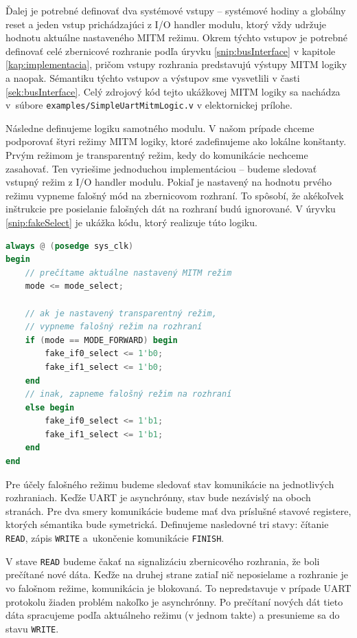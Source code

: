 Ďalej je potrebné definovať dva systémové vstupy -- systémové hodiny a globálny reset a jeden vstup prichádzajúci z I/O handler modulu, ktorý vždy udržuje hodnotu aktuálne nastaveného MITM režimu. Okrem týchto vstupov je potrebné definovať celé zbernicové rozhranie podľa úryvku \ref{snip:busInterface} v kapitole \ref{kap:implementacia}, pričom vstupy rozhrania predstavujú výstupy MITM logiky a naopak. Sémantiku týchto vstupov a výstupov sme vysvetlili v časti \ref{sek:busInterface}. Celý zdrojový kód tejto ukážkovej MITM logiky sa nachádza v~súbore \texttt{examples/SimpleUartMitmLogic.v} v elektornickej prílohe.

Následne definujeme logiku samotného modulu. V našom prípade chceme podporovať štyri režimy MITM logiky, ktoré zadefinujeme ako lokálne konštanty. Prvým režimom je transparentný režim, kedy do komunikácie nechceme zasahovať. Ten vyriešime jednoduchou implementáciou -- budeme sledovať vstupný režim z I/O handler modulu. Pokiaľ je nastavený na hodnotu prvého režimu vypneme falošný mód na zbernicovom rozhraní. To spôsobí, že akékoľvek inštrukcie pre posielanie falošných dát na rozhraní budú ignorované. V úryvku \ref{snip:fakeSelect} je ukážka kódu, ktorý realizuje túto logiku.

\begin{lstlisting}[float,language=Verilog,caption={Prepínanie medzi transparantným a falošným režimom MITM logiky.},label=snip:fakeSelect]
always @ (posedge sys_clk)
begin
    // prečítame aktuálne nastavený MITM režim
    mode <= mode_select;

    // ak je nastavený transparentný režim,
    // vypneme falošný režim na rozhraní
    if (mode == MODE_FORWARD) begin
        fake_if0_select <= 1'b0;
        fake_if1_select <= 1'b0;
    end
    // inak, zapneme falošný režim na rozhraní
    else begin
        fake_if0_select <= 1'b1;
        fake_if1_select <= 1'b1;
    end
end
\end{lstlisting}

Pre účely falošného režimu budeme sledovať stav komunikácie na jednotlivých rozhraniach. Keďže UART je asynchrónny, stav bude nezávislý na oboch stranách. Pre dva smery komunikácie budeme mať dva príslušné stavové registere, ktorých sémantika bude symetrická. Definujeme nasledovné tri stavy: čítanie \texttt{READ}, zápis \texttt{WRITE} a~ukončenie komunikácie \texttt{FINISH}.

V stave \texttt{READ} budeme čakať na signalizáciu zbernicového rozhrania, že boli prečítané nové dáta. Keďže na druhej strane zatiaľ nič neposielame a rozhranie je vo falošnom režime, komunikácia je blokovaná. To nepredstavuje v prípade UART protokolu žiaden problém nakoľko je asynchrónny. Po prečítaní nových dát tieto dáta spracujeme podľa aktuálneho režimu (v jednom takte) a presunieme sa do stavu \texttt{WRITE}.

